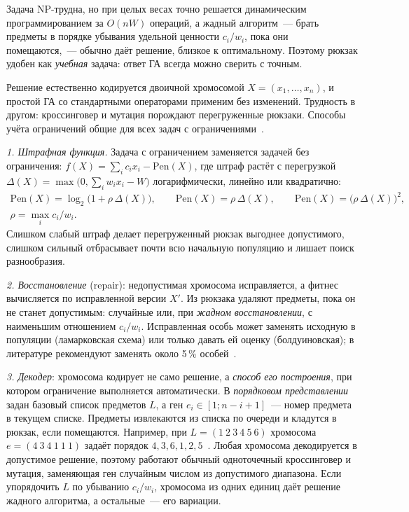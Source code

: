 Задача NP-трудна, но при целых весах точно решается динамическим программированием за $O(nW)$
операций, а жадный алгоритм~--- брать предметы в порядке убывания удельной ценности $c_i/w_i$, пока они
помещаются,~--- обычно даёт решение, близкое к оптимальному. Поэтому рюкзак удобен как \emph{учебная}
задача: ответ ГА всегда можно сверить с точным.

Решение естественно кодируется двоичной хромосомой $X = (x_1, \ldots, x_n)$, и простой ГА со
стандартными операторами применим без изменений. Трудность в другом: кроссинговер и мутация порождают
перегруженные рюкзаки. Способы учёта ограничений общие для всех задач с ограничениями~\cite{michalewicz1996,
skobtsov2018}.

\emph{1. Штрафная функция.} Задача с ограничением заменяется задачей без ограничения:
$f(X) = \sum_i c_i x_i - \mathrm{Pen}(X)$, где штраф растёт с перегрузкой $\Delta(X) = \max\bigl(0,
\sum_i w_i x_i - W\bigr)$ логарифмически, линейно или квадратично:
\begin{gather*}
\mathrm{Pen}(X) = \log_2\bigl(1 + \rho\,\Delta(X)\bigr), \qquad \mathrm{Pen}(X) = \rho\,\Delta(X), \qquad
\mathrm{Pen}(X) = \bigl(\rho\,\Delta(X)\bigr)^2, \\
\rho = \max_i c_i / w_i.
\end{gather*}
Слишком слабый штраф делает перегруженный рюкзак выгоднее допустимого, слишком сильный отбрасывает
почти всю начальную популяцию и лишает поиск разнообразия.

\emph{2. Восстановление} (repair): недопустимая хромосома исправляется, а фитнес вычисляется по
исправленной версии $X'$. Из рюкзака удаляют предметы, пока он не станет допустимым: случайные или,
при \emph{жадном восстановлении}, с наименьшим отношением $c_i/w_i$. Исправленная особь может заменять
исходную в популяции (ламарковская схема) или только давать ей оценку (болдуиновская); в литературе
рекомендуют заменять около 5\,\% особей~\cite{michalewicz1996}.

\emph{3. Декодер}: хромосома кодирует не само решение, а \emph{способ его построения}, при котором
ограничение выполняется автоматически. В \emph{порядковом представлении} задан базовый список предметов
$L$, а ген $e_i \in [1; n - i + 1]$~--- номер предмета в текущем списке. Предметы извлекаются из списка
по очереди и кладутся в рюкзак, если помещаются. Например, при $L = (1\ 2\ 3\ 4\ 5\ 6)$ хромосома
$e = (4\ 3\ 4\ 1\ 1\ 1)$ задаёт порядок $4, 3, 6, 1, 2, 5$~\cite{skobtsov2018}. Любая хромосома
декодируется в допустимое решение, поэтому работают обычный одноточечный кроссинговер и мутация, заменяющая
ген случайным числом из допустимого диапазона. Если упорядочить $L$ по убыванию $c_i/w_i$, хромосома из
одних единиц даёт решение жадного алгоритма, а остальные~--- его вариации.

